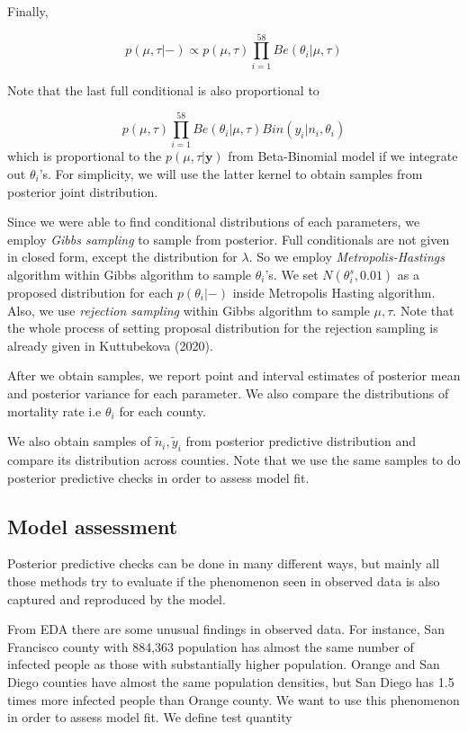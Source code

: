 \documentclass[11pt,twocolumn]{asaproc}
\begin{document}
Finally, 

$$p(\mu, \tau | -) \propto p(\mu, \tau)\prod_{i=1}^{58}Be(\theta_i|\mu, \tau)$$

Note that the last full conditional is also proportional to 

$$p(\mu, \tau)\prod_{i=1}^{58}Be(\theta_i|\mu, \tau)Bin(y_i|n_i, \theta_i)$$ which is proportional to the $p(\mu, \tau | \mathbf{y})$ from Beta-Binomial model if we integrate out $\theta_i$'s. For simplicity, we will use the latter kernel to obtain samples from posterior joint distribution.


Since we were able to find conditional distributions of each parameters, we employ \textit{Gibbs sampling} to sample from posterior. Full conditionals are not given in closed form, except the distribution for $\lambda$. So we employ \textit{Metropolis-Hastings} algorithm within Gibbs algorithm to sample $\theta_i$'s. We set $N(\theta_i^{s}, 0.01)$ as a proposed distribution for each $p(\theta_i |-)$ inside Metropolis Hasting algorithm. Also, we use \textit{rejection sampling} within Gibbs algorithm to sample $\mu, \tau$. Note that the whole process of setting proposal distribution for the rejection sampling is already given in Kuttubekova (2020). 

After we obtain samples, we report point and interval estimates of posterior mean and posterior variance for each parameter. We also compare the distributions of mortality rate i.e $\theta_i$ for each county. 

We also obtain samples of $\tilde{n}_i, \tilde{y}_i$ from posterior predictive distribution and compare its distribution across counties. Note that we use the same samples to do posterior predictive checks in order to assess model fit. 






\subsection{Model assessment}
Posterior predictive checks can be done in many different ways, but mainly all those methods try to evaluate if the phenomenon seen in observed data is also captured and reproduced by the model. 

From EDA there are some unusual findings in observed data. For instance, San Francisco county with 884,363 population has almost the same number of infected people as those with substantially higher population. Orange and San Diego counties have almost the same population densities, but San Diego has 1.5 times more infected people than Orange county. We want to use this phenomenon in order to assess model fit. We define test quantity 
\end{document}
